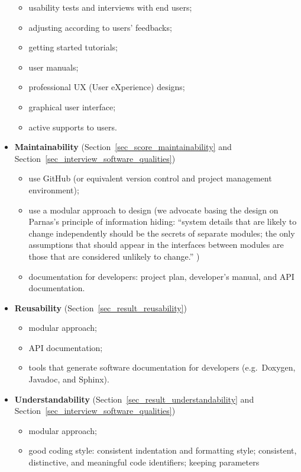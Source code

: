 \documentclass[final, 3p, times, authoryear]{elsarticle}
\begin{document}
\begin{itemize}
\begin{itemize}
    \item usability tests and interviews with end users;
    \item adjusting according to users’ feedbacks;
    \item getting started tutorials;
    \item user manuals;
    \item professional UX (User eXperience) designs;
    \item graphical user interface;
    \item active supports to users.
\end{itemize}
\item \textbf{Maintainability} (Section~\ref{sec_score_maintainability} and Section~\ref{sec_interview_software_qualities})
\begin{itemize}
    \item use GitHub (or equivalent version control and project management environment);
    \item use a modular approach to design (we advocate basing the design on
    Parnas's principle of information hiding: ``system details that are likely
    to change independently should be the secrets of separate modules; the only
    assumptions that should appear in the interfaces between modules are those
    that are considered unlikely to change.'' \citep{ParnasEtAl2000})
    \item documentation for developers: project plan, developer’s manual, and API documentation.
\end{itemize}
\item \textbf{Reusability} (Section~\ref{sec_result_reusability})
\begin{itemize}
    \item modular approach;
    \item API documentation;
    \item tools that generate software documentation for developers (e.g.\
    Doxygen, Javadoc, and Sphinx).
\end{itemize}
\item \textbf{Understandability} (Section~\ref{sec_result_understandability} and
Section~\ref{sec_interview_software_qualities})
\begin{itemize}
    \item modular approach;
    \item good coding style: consistent indentation and formatting style;
    consistent, distinctive, and meaningful code identifiers; keeping parameters

\end{itemize}
\end{itemize}
\end{document}
